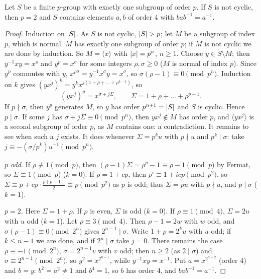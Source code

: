 \begin{lemma}\label{lem:wb-pgroup}
Let $S$ be a finite $p$-group with exactly one subgroup of order $p$. If $S$ is not cyclic, then $p=2$ and $S$ contains
elements $a,b$ of order $4$ with $bab^{-1}=a^{-1}$.
\end{lemma}
\begin{proof}
Induction on $\lvert S\rvert$. As $S$ is not cyclic, $\lvert S\rvert>p$; let $M$ be a subgroup of index $p$, which is normal. $M$ has exactly
one subgroup of order $p$; if $M$ is not cyclic we are done by induction. So $M=\langle x\rangle$ with $\lvert x\rvert=p^n$, $n\ge1$.
Choose $y\in S\setminus M$; then $y^{-1}xy=x^\rho$ and $y^p=x^\sigma$ for some integers $\rho,\sigma\ge0$ ($M$ is normal of
index $p$). Since $y^p$ commutes with $y$, $x^{\rho\sigma}=y^{-1}x^\sigma y=x^\sigma$, so $\sigma(\rho-1)\equiv0\pmod{p^n}$. Induction
on $k$ gives $(yx^j)^k=y^kx^{j(1+\rho+\dots+\rho^{k-1})}$, so
\[
(yx^j)^p=x^{\sigma+j\Sigma},\qquad \Sigma=1+\rho+\dots+\rho^{p-1}.
\]
If $p\nmid\sigma$, then $y^p$ generates $M$, so $y$ has order $p^{n+1}=\lvert S\rvert$ and $S$ is cyclic. Hence $p\mid\sigma$. If
some $j$ has $\sigma+j\Sigma\equiv0\pmod{p^n}$, then $yx^j\notin M$ has order $p$, and $\langle yx^j\rangle$ is a second
subgroup of order $p$, as $M$ contains one: a contradiction. It remains to see when such a $j$ exists. It does whenever
$\Sigma=p^ku$ with $p\nmid u$ and $p^k\mid\sigma$: take $j\equiv-(\sigma/p^k)u^{-1}\pmod{p^n}$.

\emph{$p$ odd.} If $\rho\not\equiv1\pmod p$, then $(\rho-1)\Sigma=\rho^p-1\equiv\rho-1\pmod p$ by Fermat, so $\Sigma\equiv1\pmod p$
($k=0$). If $\rho=1+cp$, then $\rho^i\equiv1+icp\pmod{p^2}$, so $\Sigma\equiv p+cp\cdot\frac{p(p-1)}2\equiv p\pmod{p^2}$ as $p$ is odd;
thus $\Sigma=pu$ with $p\nmid u$, and $p\mid\sigma$ ($k=1$).

\emph{$p=2$.} Here $\Sigma=1+\rho$. If $\rho$ is even, $\Sigma$ is odd ($k=0$). If $\rho\equiv1\pmod4$, $\Sigma=2u$ with $u$ odd
($k=1$). Let $\rho\equiv3\pmod 4$. Then $\rho-1=2w$ with $w$ odd, and $\sigma(\rho-1)\equiv0\pmod{2^n}$ gives $2^{n-1}\mid\sigma$.
Write $1+\rho=2^ku$ with $u$ odd; if $k\le n-1$ we are done, and if $2^n\mid\sigma$ take $j=0$. There remains the case
$\rho\equiv-1\pmod{2^n}$, $\sigma=2^{n-1}v$ with $v$ odd; then $n\ge2$ (as $2\mid\sigma$) and $\sigma\equiv2^{n-1}\pmod{2^n}$, so
$y^2=x^{2^{n-1}}$, while $y^{-1}xy=x^{-1}$. Put $a=x^{2^{n-2}}$ (order $4$) and $b=y$: $b^2=a^2\ne1$ and $b^4=1$, so $b$ has
order $4$, and $bab^{-1}=a^{-1}$.
\end{proof}

